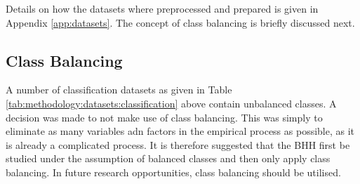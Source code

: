 \begin{table}[htbp]
    \centering
    \caption{Regression datasets}
    \label{tab:methodology:datasets:regression}%
	\par\bigskip
\end{table}%

Details on how the datasets where preprocessed and prepared is given in Appendix \ref{app:datasets}. The concept of class balancing is briefly discussed next.

\subsection{Class Balancing}

A number of classification datasets as given in Table \ref{tab:methodology:datasets:classification} above contain unbalanced classes. A decision was made to not make use of class balancing. This was simply to eliminate as many variables adn factors in the empirical process as possible, as it is already a complicated process.  It is therefore suggested that the \ac{BHH} first be studied under the assumption of balanced classes and then only apply class balancing. In future research opportunities, class balancing should be utilised.


